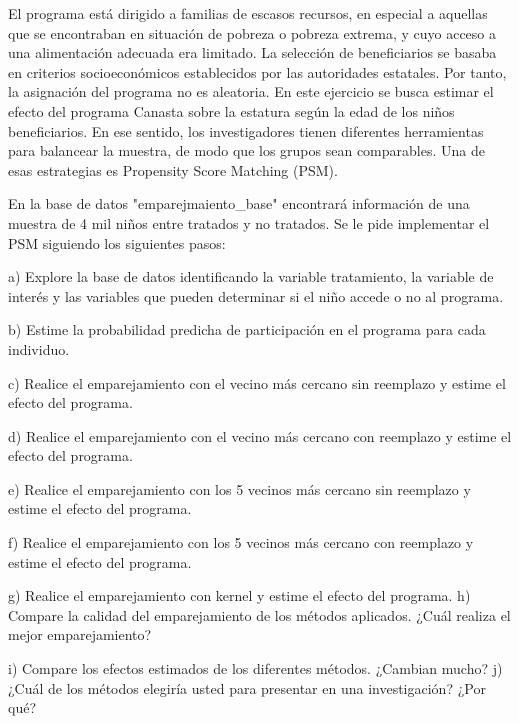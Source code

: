 \documentclass[12pt]{article}
\begin{document}
El programa está dirigido a familias de escasos recursos, en especial a aquellas que se encontraban en situación de pobreza o pobreza extrema, y cuyo acceso a una alimentación adecuada era limitado. La selección de beneficiarios se basaba en criterios socioeconómicos establecidos por las autoridades estatales. Por tanto, la asignación del programa no es aleatoria. 
En este ejercicio se busca estimar el efecto del programa Canasta sobre la estatura según la edad de los niños beneficiarios. En ese sentido, los investigadores tienen diferentes herramientas para balancear la muestra, de modo que los grupos sean comparables. Una de esas estrategias es Propensity Score Matching (PSM).
\vspace{0.5cm}

En la base de datos "emparejmaiento\_base" encontrará información de una muestra de 4 mil niños entre tratados y no tratados. Se le pide implementar el PSM siguiendo los siguientes pasos: 

a) Explore la base de datos identificando la variable tratamiento, la variable de interés y las variables que pueden determinar si el niño accede o no al programa. 

b) Estime la probabilidad predicha de participación en el programa para cada individuo. 

c) Realice el emparejamiento con el vecino más cercano sin reemplazo y estime el efecto del programa. 

d) Realice el emparejamiento con el vecino más cercano con reemplazo y estime el efecto del programa. 

e) Realice el emparejamiento con los 5 vecinos más cercano sin reemplazo y estime el efecto del programa. 

f) Realice el emparejamiento con los 5 vecinos más cercano con reemplazo y estime el efecto del programa. 

g) Realice el emparejamiento con kernel y estime el efecto del programa. h) Compare la calidad del emparejamiento de los métodos aplicados. ¿Cuál realiza el mejor emparejamiento? 

i) Compare los efectos estimados de los diferentes métodos. ¿Cambian mucho? j) ¿Cuál de los métodos elegiría usted para presentar en una investigación? ¿Por qué? 








\end{document}
